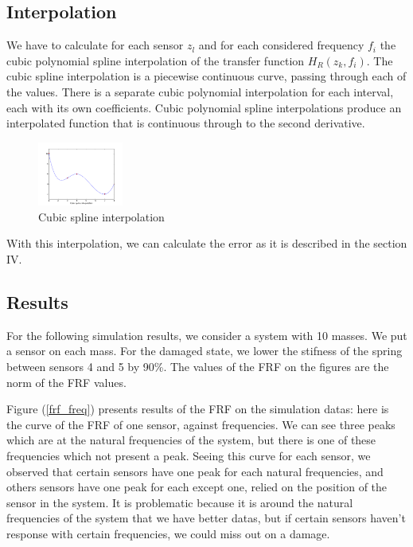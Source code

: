 \documentclass[journal]{IEEEtran}
\begin{document}
\subsection{Interpolation}

We have to calculate for each sensor $z_l$ and for each considered frequency $f_i$ the cubic polynomial spline interpolation of the transfer function $H_R(z_k,f_i)$.
The cubic spline interpolation is a piecewise continuous curve, passing through each of the values.
There is a separate cubic polynomial interpolation for each interval, each with its own coefficients.
Cubic polynomial spline interpolations produce an interpolated function that is continuous through to the second derivative.

\begin{figure}[h!]
  \centering
  \includegraphics[width=0.25\textwidth]{images/interpolation_spline.png}
  \caption{Cubic spline interpolation}
  \label{spline}
\end{figure}


With this interpolation, we can calculate the error as it is described in the section IV.

\subsection{Results}

For the following simulation results, we consider a system with 10 masses. We put a sensor on each mass. For the damaged state, we lower the stifness of the spring between sensors 4 and 5 by 90\%. The values of the FRF on the figures are the norm of the FRF values.

Figure (\ref{frf_freq}) presents results of the FRF on the simulation datas: here is the curve of the FRF of one sensor, against frequencies. We can see three peaks which are at the natural frequencies of the system, but there is one of these frequencies which not present a peak. Seeing this curve for each sensor, we observed that certain sensors have one peak for each natural frequencies, and others sensors have one peak for each except one, relied on the position of the sensor in the system. It is problematic because it is around the natural frequencies of the system that we have better datas, but if certain sensors haven't response with certain frequencies, we could miss out on a damage.
\end{document}
